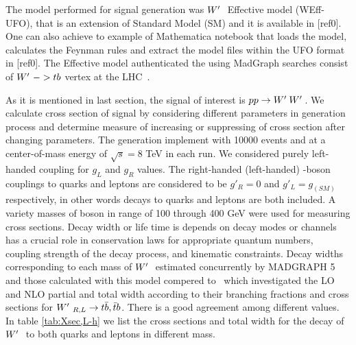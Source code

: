 The model performed for signal generation was $W^\prime~$ Effective model {\small (WEff-UFO)}, that is an extension of Standard Model {\small (SM)} and it is available in [ref0]. One can also achieve to example of Mathematica notebook that loads the model, calculates the Feynman rules and extract the model files within the UFO format in [ref0]. The \wprime Effective model authenticated the using MadGraph searches consist of $W^\prime~ -> tb$ vertex at the LHC~\cite{ATLAS-CONF-2013-050}.
 
  As it is mentioned in last section, the signal of interest is $ pp\rightarrow {\tiny \ensuremath{W^\prime}~\ensuremath{W^\prime}~} $. We calculate cross section of signal by considering different parameters in generation process and determine measure of increasing or suppressing of cross section after changing parameters. The generation implement with 10000 events and at a center-of-mass energy of $ \sqrt{s}=8 $ TeV in each run. We considered purely left-handed coupling  for $ g_L $ and $ g_R $ values. The right-handed (left-handed) \wprime-boson couplings to quarks and leptons are considered to be $g'_R = 0$ and $g'_L = g_{(SM)}$ respectively, in other words decays to quarks and leptons are both included. A variety masses of \wprime boson in range of 100 through 400 GeV were used for measuring cross sections.  Decay width or life time is depends on decay modes or channels has a crucial role in conservation laws for appropriate quantum numbers, coupling strength of the decay process, and kinematic constraints. Decay widths corresponding to each mass of $ W^\prime~ $ estimated concurrently by {\small MADGRAPH 5} and those calculated with this model compered to~\cite{Sullivan:2002jt} which investigated the LO and NLO partial and total width according to their branching fractions and cross sections for  $ W^\prime~_{R,L}\rightarrow t \bar{b},\bar{t}b $.  There is a good agreement among different values.  In table \ref{tab:Xsec,L-h} we list the cross sections and total width for the decay of $ W^\prime~ $ to both quarks and leptons in different mass. 

